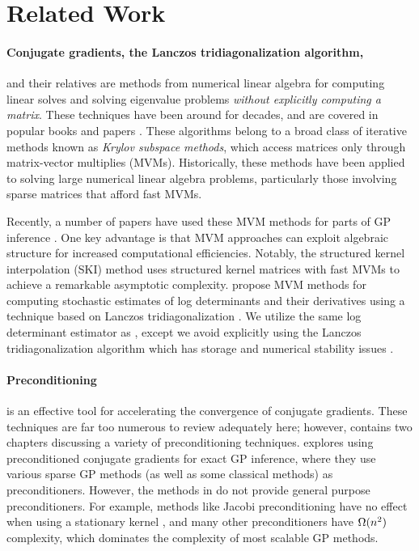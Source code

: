\section{Related Work}
\paragraph{Conjugate gradients, the Lanczos tridiagonalization algorithm,}
and their relatives are methods from numerical linear algebra for computing linear solves and solving eigenvalue problems \emph{without explicitly computing a matrix}.
These techniques have been around for decades, and are covered in popular books and papers \cite{saad2003iterative,golub2012matrix,demmel1997applied,parlett1980new,lanczos1950iteration,datta2010numerical,paige1970practical}.
These algorithms belong to a broad class of iterative methods known as \emph{Krylov subspace methods}, which access matrices only through matrix-vector multiplies (MVMs).
Historically, these methods have been applied to solving large numerical linear algebra problems, particularly those involving sparse matrices that afford fast MVMs.

Recently, a number of papers have used these MVM methods for parts of GP inference \cite{dong2017scalable,cunningham2008fast,murray2009gaussian,saatcci2012scalable,wilson2014thesis,wilson2015kernel,gardner2018product,pleiss2018constant}.
One key advantage is that MVM approaches can exploit algebraic structure for increased computational efficiencies.
Notably, the structured kernel interpolation (SKI) method \cite{wilson2015kernel} uses structured kernel matrices with fast MVMs to achieve a remarkable asymptotic complexity.
\citet{dong2017scalable} propose MVM methods for computing stochastic estimates of log determinants and their derivatives using a technique based on Lanczos tridiagonalization \cite{golub2009matrices,ubaru2017fast}.
We utilize the same log determinant estimator as \citet{dong2017scalable}, except we avoid explicitly using the Lanczos tridiagonalization algorithm which has storage and numerical stability issues \cite{golub2012matrix}.

\paragraph{Preconditioning} is an effective tool for accelerating the convergence of conjugate gradients.
These techniques are far too numerous to review adequately here; however, \citet{saad2003iterative} contains two chapters discussing a variety of preconditioning techniques.
\citet{cutajar2016preconditioning} explores using preconditioned conjugate gradients for exact GP inference, where they use various sparse GP methods (as well as some classical methods) as preconditioners. However, the methods in \citet{cutajar2016preconditioning} do not provide general purpose preconditioners.
For example, methods like Jacobi preconditioning have no effect when using a stationary kernel \cite{cutajar2016preconditioning,wilson2015thoughts}, and many other preconditioners have $\bigomega{n^{2}}$ complexity, which dominates the complexity of most scalable GP methods.

